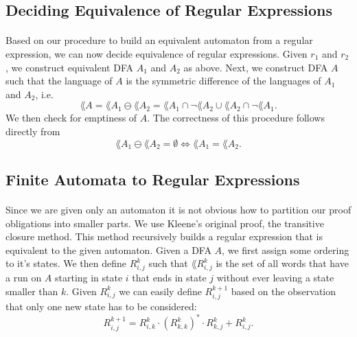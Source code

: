 \documentclass[11pt,a4paper,oneside]{book}
\begin{document}
            \subsection{Deciding Equivalence of Regular Expressions}

                \paragraph{} 
                    Based on our procedure to build an equivalent automaton from a regular expression, we can now decide equivalence of regular expressions. Given $r_1$ and $r_2$, we construct equivalent DFA $A_1$ and $A_2$ as above.
                    Next, we construct DFA $A$ such that the language of $A$ is the symmetric difference of the languages of $A_1$ and $A_2$, i.e. 
                    \[ \lang{A} = \lang{A_1} \ominus \lang{A_2} = \lang{A_1} \cap \neg \lang{A_2} \cup \lang{A_2} \cap \neg \lang{A_1}.
                    \] 
                    We then check for emptiness of $A$. The correctness of this procedure follows directly from 
                    \[ 
                        \lang{A_1} \ominus \lang{A_2} = \emptyset \Leftrightarrow \lang{A_1} = \lang{A_2}.
                    \]
                    

            \subsection{Finite Automata to Regular Expressions}
                
                \paragraph{}
                    Since we are given only an automaton it is not obvious how to partition our proof obligations into smaller parts.
                    We use Kleene's original proof, the transitive closure method. 
                    This method recursively builds a regular expression that is equivalent to the given automaton.
                    Given a DFA $A$, we first assign some ordering to it's states. We then define $R^k_{i,j}$ such that 
                    $\lang{R^k_{i,j}}$ is the set of all words that have a run on $A$ starting in state $i$ that ends in state $j$ without ever leaving a state smaller than $k$. Given $R^k_{i,j}$ we can easily define $R^{k+1}_{i,j}$ based on the observation that only one new state has to be considered:
                    \[
                        R^{k+1}_{i,j} = R^{k}_{i,k} \cdot (R^{k}_{k,k})^* \cdot R^{k}_{k,j} + R^{k}_{i,j}.
                    \]
\end{document}
